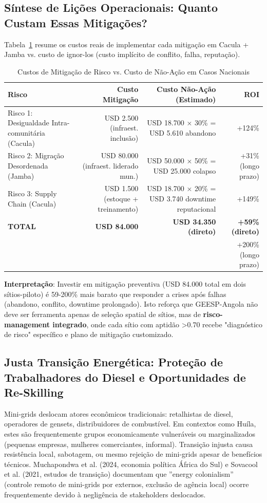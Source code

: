 \documentclass[12pt, a4paper]{article}
\begin{document}
\subsection{Síntese de Lições Operacionais: Quanto Custam Essas Mitigações?}

Tabela~\ref{tab:mitigation_costs} resume os custos reais de implementar cada mitigação em Cacula + Jamba vs. custo de ignor-los (custo implícito de conflito, falha, reputação).

\begin{table}[ht]
\centering
\caption{Custos de Mitigação de Risco vs. Custo de Não-Ação em Casos Nacionais}
\label{tab:mitigation_costs}
\footnotesize
\begin{tabular}{|l|r|r|r|}
\hline
\textbf{Risco} & \textbf{Custo Mitigação} & \textbf{Custo Não-Ação (Estimado)} & \textbf{ROI} \\
\hline
Risco 1: Desigualdade Intra-comunitária (Cacula) & USD 2.500 (infraest. inclusão) & USD 18.700 × 30\% = USD 5.610 abandono & +124\% \\
Risco 2: Migração Desordenada (Jamba) & USD 80.000 (infraest. liderado mun.) & USD 50.000 × 50\% = USD 25.000 colapso & +31\% (longo prazo) \\
Risco 3: Supply Chain (Cacula) & USD 1.500 (estoque + treinamento) & USD 18.700 × 20\% = USD 3.740 downtime reputacional & +149\% \\
\hline
\textbf{TOTAL} & \textbf{USD 84.000} & \textbf{USD 34.350 (direto)} & \textbf{+59\% (direto)} \\
&&  & +200\% (longo prazo) \\
\hline
\end{tabular}
\end{table}
\textbf{Interpretação}: Investir em mitigação preventiva (USD 84.000 total em dois sítios-piloto) é 59-200\% mais barato que responder a crises após falhas (abandono, conflito, downtime prolongado). Isto reforça que GEESP-Angola não deve ser ferramenta apenas de seleção spatial de sítios, mas de
\textbf{risco-management integrado}, onde cada sítio com aptidão >0.70 recebe "diagnóstico de risco" específico e plano de mitigação customizado.

\subsection{Justa Transição Energética: Proteção de Trabalhadores do Diesel e Oportunidades de Re-Skilling}

Mini-grids deslocam atores econômicos tradicionais: retalhistas de diesel, operadores de gensets, distribuidores de combustível. Em contextos como Huíla, estes são frequentemente grupos economicamente vulneráveis ou marginalizados (pequenas empresas, mulheres comerciantes, informal). Transição injusta causa resistência local, sabotagem, ou mesmo rejeição de mini-grids apesar de benefícios técnicos. Muchapondwa et al. (2024, economia política África do Sul) e Sovacool et al. (2021, estudos de transição) documentam que ''energy colonialism'' (controle remoto de mini-grids por externos, exclusão de agência local) ocorre frequentemente devido à negligência de stakeholders deslocados.
\end{document}
